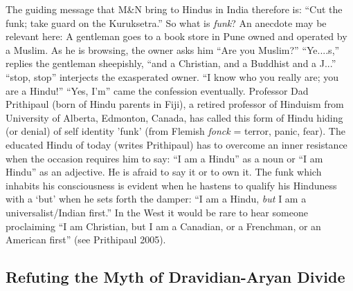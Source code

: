 The guiding message that M\&N bring to Hindus in India therefore is: “Cut the funk; take guard on the Kuruksetra.” So what is \textit{funk}? An anecdote may be relevant here: A gentleman goes to a book store in Pune owned and operated by a Muslim. As he is browsing, the owner asks him “Are you Muslim?” “Ye....s,” replies the gentleman sheepishly, “and a Christian, and a Buddhist and a J...” “stop, stop” interjects the exasperated owner. “I know who you really are; you are a Hindu!” “Yes, I’m” came the confession eventually. Professor Dad Prithipaul (born of Hindu parents in Fiji), a retired professor of Hinduism from University of Alberta, Edmonton, Canada, has called this form of Hindu hiding (or denial) of self identity 'funk' (from Flemish \textit{fonck} = terror, panic, fear). The educated Hindu of today (writes Prithipaul) has to overcome an inner resistance when the occasion requires him to say: “I am a Hindu” as a noun or “I am Hindu” as an adjective. He is afraid to say it or to own it. The funk which inhabits his consciousness is evident when he hastens to qualify his Hinduness with a ‘but’ when he sets forth the damper: “I am a Hindu, \textit{but} I am a universalist/Indian first.” In the West it would be rare to hear someone proclaiming “I am Christian, but I am a Canadian, or a Frenchman, or an American first” (see Prithipaul 2005).


\subsection*{Refuting the Myth of Dravidian-Aryan Divide}

